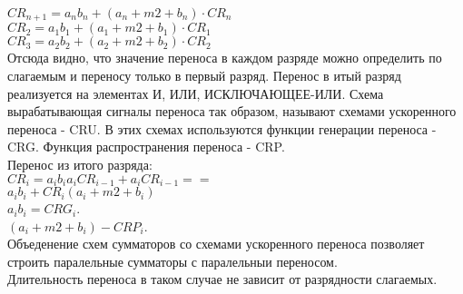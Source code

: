 $ CR_{n+1} = a_n b_n + (a_n +m2+ b_n) \cdot CR_n $\\
$CR_2 = a_1 b_1 + (a_1 +m2+ b_1) \cdot CR_1 $\\
$CR_3 = a_2 b_2 + (a_2 +m2+ b_2) \cdot CR_2 $\\
Отсюда видно, что значение переноса в каждом разряде можно определить по слагаемым и переносу только в первый разряд.
Перенос в итый разряд реализуется на элементах И, ИЛИ, ИСКЛЮЧАЮЩЕЕ-ИЛИ.
Схема вырабатывающая сигналы переноса так образом, называют схемами ускоренного переноса - CRU.
В этих схемах используются функции генерации переноса - CRG. Функция распространения переноса - CRP.\\
Перенос из итого разряда:\\
$CR_i = a_i b_i  a_i CR_{i-1} +a_i CR_{i-1} ==$\\
$a_i b_i + CR_i (a_i +m2+ b_i)$\\
$a_i b_i = CRG_i$.\\
$ (a_i +m2+ b_i) - CRP_i$.\\
Объеденение схем сумматоров со схемами ускоренного переноса позволяет строить паралельные сумматоры с паралельныи переносом.\\
Длительность переноса в таком случае не зависит от разрядности слагаемых.\\



























